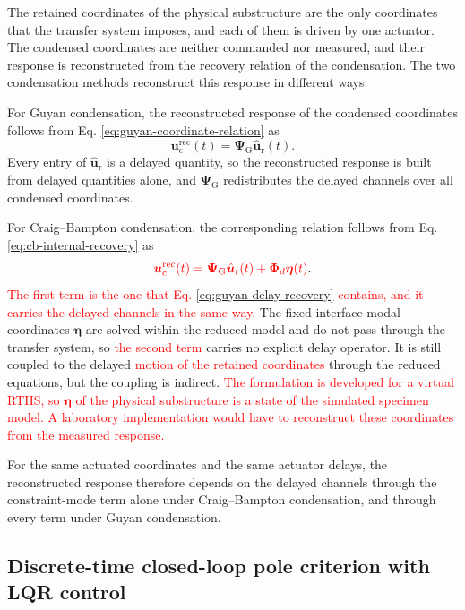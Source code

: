 \documentclass[11pt,a4paper]{article}
\numberwithin{equation}{section}
\newcommand{\rev}[1]{\textcolor{red}{#1}}
\begin{document}
The retained coordinates of the physical substructure are the only coordinates that the transfer system imposes, and each of them is driven by one actuator. The condensed coordinates are neither commanded nor measured, and their response is reconstructed from the recovery relation of the condensation. The two condensation methods reconstruct this response in different ways.

For Guyan condensation, the reconstructed response of the condensed coordinates follows from Eq. \eqref{eq:guyan-coordinate-relation} as
\begin{equation}
	\bm{u}_{\mathrm{c}}^{\mathrm{rec}}(t)=\bm{\Psi}_{\mathrm{G}}\hat{\bm{u}}_{\mathrm{r}}(t).
	\label{eq:guyan-delay-recovery}
\end{equation}
Every entry of \(\hat{\bm{u}}_{\mathrm{r}}\) is a delayed quantity, so the reconstructed response is built from delayed quantities alone, and \(\bm{\Psi}_{\mathrm{G}}\) redistributes the delayed channels over all condensed coordinates.

For Craig--Bampton condensation, the corresponding relation follows from Eq. \eqref{eq:cb-internal-recovery} as
\begin{equation}
	\rev{\bm{u}_{\mathrm{c}}^{\mathrm{rec}}(t)=
		\bm{\Psi}_{\mathrm{G}}\hat{\bm{u}}_{\mathrm{r}}(t)
		+\bm{\Phi}_{d}\bm{\eta}(t)}.
	\label{eq:cb-delay-recovery}
\end{equation}
\rev{The first term is the one that Eq. \eqref{eq:guyan-delay-recovery} contains, and it carries the delayed channels in the same way.} The fixed-interface modal coordinates \(\bm{\eta}\) are solved within the reduced model and do not pass through the transfer system, so \rev{the second term} carries no explicit delay operator. It is still coupled to the delayed \rev{motion of the retained coordinates} through the reduced equations, but the coupling is indirect. \rev{The formulation is developed for a virtual RTHS, so \(\bm{\eta}\) of the physical substructure is a state of the simulated specimen model. A laboratory implementation would have to reconstruct these coordinates from the measured response.}

For the same actuated coordinates and the same actuator delays, the reconstructed response therefore depends on the delayed channels through the constraint-mode term alone under Craig--Bampton condensation, and through every term under Guyan condensation.

\subsection{Discrete-time closed-loop pole criterion with LQR control}
\label{sec:pole-criterion}
\end{document}
